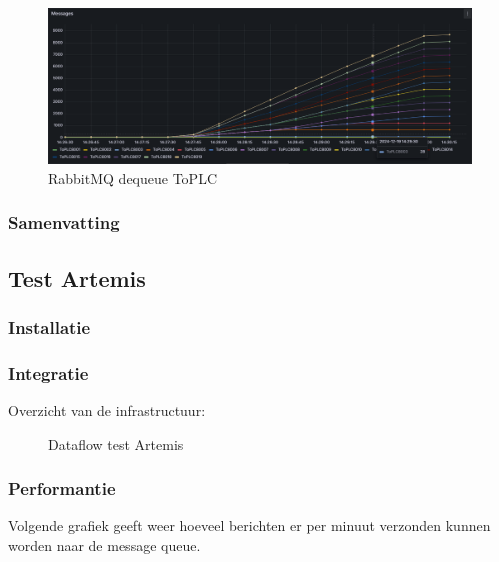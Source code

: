 \begin{figure}[h!]
  \centering
  \includegraphics[width=.95\textwidth]{img/rabbitmq-dequeue-count-ToPLC.png}
  \caption{\label{fig:fig:rabbitmq_dequeue_fromplc_count}RabbitMQ dequeue ToPLC}
\end{figure}

\subsubsection{Samenvatting}




\subsection{Test Artemis}

\subsubsection{Installatie}
 
\subsubsection{Integratie}

Overzicht van de infrastructuur:
\begin{figure}[h!]
  \centering
  \caption{\label{fig:test_artemis_dataflow}Dataflow test Artemis}
\end{figure}

\subsubsection{Performantie}
Volgende grafiek geeft weer hoeveel berichten er per minuut verzonden kunnen worden naar de message queue.









